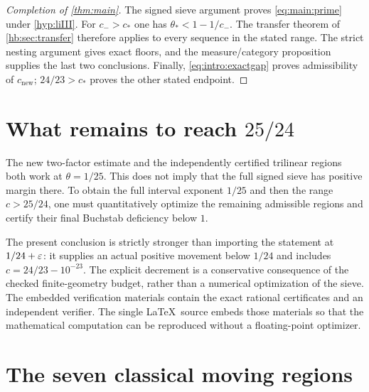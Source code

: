 \begin{proof}[Completion of \cref{thm:main}]
The signed sieve argument proves \eqref{eq:main:prime} under
\cref{hyp:liIII}. For $c_->c_*$ one has
$\theta_*<1-1/c_-$. The transfer theorem of
\cref{hb:sec:transfer} therefore applies to every sequence in the
stated range. The strict nesting argument gives exact floors, and
the measure/category proposition supplies the last two conclusions.
Finally, \eqref{eq:intro:exactgap} proves admissibility of
$c_{\mathrm{new}}$; $24/23>c_*$ proves the other stated endpoint.
\end{proof}

\section{What remains to reach \texorpdfstring{$25/24$}{25/24}}

The new two-factor estimate and the independently certified
trilinear regions both work at $\theta=1/25$.
This does not imply that the full signed sieve has positive margin
there.
To obtain the full interval exponent $1/25$ and then the range
$c>25/24$, one must quantitatively optimize the remaining admissible
regions and certify their final Buchstab deficiency below $1$.

The present conclusion is strictly stronger than importing the
statement at $1/24+\varepsilon$: it supplies an actual positive movement
below $1/24$ and includes $c=24/23-10^{-23}$.
The explicit decrement is a conservative consequence of the checked
finite-geometry budget, rather than a numerical optimization of the sieve.
The embedded verification materials contain the exact rational
certificates and an independent verifier.
The single \LaTeX\ source embeds those materials so that the
mathematical computation can be reproduced without a floating-point
optimizer.

\appendix
\section{The seven classical moving regions}\label{app:regions}

